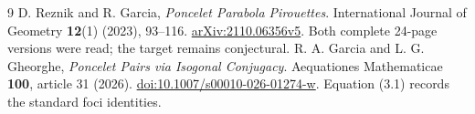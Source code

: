 \documentclass[11pt]{article}
\begin{document}
\begin{thebibliography}{9}
 D. Reznik and R. Garcia,
\emph{Poncelet Parabola Pirouettes}.
International Journal of Geometry \textbf{12}(1) (2023), 93--116.
\href{https://arxiv.org/abs/2110.06356}{arXiv:2110.06356v5}.
Both complete 24-page versions were read; the target remains conjectural.
 R. A. Garcia and L. G. Gheorghe,
\emph{Poncelet Pairs via Isogonal Conjugacy}.
Aequationes Mathematicae \textbf{100}, article 31 (2026).
\href{https://doi.org/10.1007/s00010-026-01274-w}{doi:10.1007/s00010-026-01274-w}.
Equation (3.1) records the standard foci identities.
\end{thebibliography}
\end{document}
